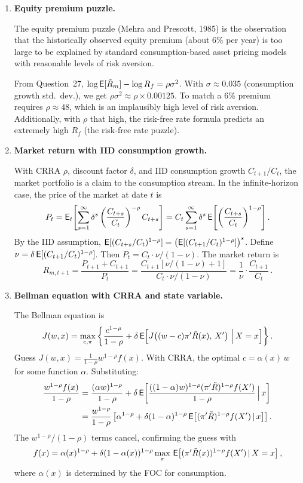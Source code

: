 \begin{enumerate}
\item \textbf{Equity premium puzzle.}

The equity premium puzzle (Mehra and Prescott, 1985) is the observation that the historically observed equity premium (about 6\% per year) is too large to be explained by standard consumption-based asset pricing models with reasonable levels of risk aversion.

From Question~27, $\log\mathsf{E}[\tilde{R}_m]-\log R_f = \rho\sigma^2$.  With $\sigma \approx 0.035$ (consumption growth std.\ dev.), we get $\rho\sigma^2 \approx \rho\times 0.00125$.  To match a 6\% premium requires $\rho \approx 48$, which is an implausibly high level of risk aversion.  Additionally, with $\rho$ that high, the risk-free rate formula predicts an extremely high $R_f$ (the risk-free rate puzzle).

\item \textbf{Market return with IID consumption growth.}

With CRRA $\rho$, discount factor $\delta$, and IID consumption growth $C_{t+1}/C_t$, the market portfolio is a claim to the consumption stream.  In the infinite-horizon case, the price of the market at date $t$ is
\[
P_t = \mathsf{E}_t\!\left[\sum_{s=1}^{\infty}\delta^s\left(\frac{C_{t+s}}{C_t}\right)^{-\rho}C_{t+s}\right] = C_t\sum_{s=1}^{\infty}\delta^s\,\mathsf{E}\!\left[\left(\frac{C_{t+s}}{C_t}\right)^{1-\rho}\right].
\]
By the IID assumption, $\mathsf{E}[(C_{t+s}/C_t)^{1-\rho}] = \left(\mathsf{E}[(C_{t+1}/C_t)^{1-\rho}]\right)^s$.  Define $\nu = \delta\,\mathsf{E}[(C_{t+1}/C_t)^{1-\rho}]$.  Then $P_t = C_t\cdot\nu/(1-\nu)$.  The market return is
\[
R_{m,t+1} = \frac{P_{t+1}+C_{t+1}}{P_t} = \frac{C_{t+1}[\nu/(1-\nu)+1]}{C_t\cdot\nu/(1-\nu)} = \frac{1}{\nu}\cdot\frac{C_{t+1}}{C_t}\,.
\]

\item \textbf{Bellman equation with CRRA and state variable.}

The Bellman equation is
\[
J(w,x) = \max_{c,\pi}\left\{\frac{c^{1-\rho}}{1-\rho} + \delta\,\mathsf{E}\!\left[J\!\left((w-c)\pi'\tilde{R}(x),\,X'\right)\,\Big|\,X=x\right]\right\}.
\]
Guess $J(w,x) = \frac{1}{1-\rho}w^{1-\rho}f(x)$.  With CRRA, the optimal $c = \alpha(x)\,w$ for some function $\alpha$.  Substituting:
\begin{align*}
\frac{w^{1-\rho}f(x)}{1-\rho} &= \frac{(\alpha w)^{1-\rho}}{1-\rho} + \delta\,\mathsf{E}\!\left[\frac{((1-\alpha)w)^{1-\rho}(\pi'\tilde{R})^{1-\rho}f(X')}{1-\rho}\,\Big|\,x\right]\\
&= \frac{w^{1-\rho}}{1-\rho}\left[\alpha^{1-\rho} + \delta(1-\alpha)^{1-\rho}\,\mathsf{E}\!\left[(\pi'\tilde{R})^{1-\rho}f(X')\,|\,x\right]\right].
\end{align*}
The $w^{1-\rho}/(1-\rho)$ terms cancel, confirming the guess with
\[
f(x) = \alpha(x)^{1-\rho} + \delta(1-\alpha(x))^{1-\rho}\max_\pi\,\mathsf{E}\!\left[(\pi'\tilde{R}(x))^{1-\rho}f(X')\,|\,X=x\right],
\]
where $\alpha(x)$ is determined by the FOC for consumption.


\end{enumerate}
